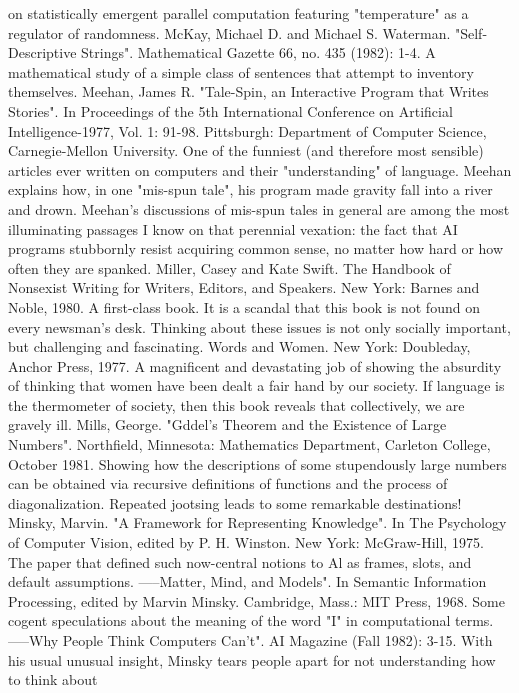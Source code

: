   on statistically emergent parallel computation featuring "temperature" as a regulator of
  randomness.
McKay, Michael D. and Michael S. Waterman. "Self-Descriptive Strings". Mathematical
  Gazette 66, no. 435 (1982): 1-4. A mathematical study of a simple class of sentences that
  attempt to inventory themselves.
Meehan, James R. "Tale-Spin, an Interactive Program that Writes Stories". In Proceedings of
  the 5th International Conference on Artificial Intelligence-1977, Vol. 1: 91-98. Pittsburgh:
  Department of Computer Science, Carnegie-Mellon University. One of the funniest (and
  therefore most sensible) articles ever written on computers and their "understanding" of
  language. Meehan explains how, in one "mis-spun tale", his program made gravity fall into
  a river and drown. Meehan's discussions of mis-spun tales in general are among the most
  illuminating passages I know on that perennial vexation: the fact that AI programs
  stubbornly resist acquiring common sense, no matter how hard or how often they are
  spanked.
Miller, Casey and Kate Swift. The Handbook of Nonsexist Writing for Writers, Editors, and
  Speakers. New York: Barnes and Noble, 1980. A first-class book. It is a scandal that this
  book is not found on every newsman's desk. Thinking about these issues is not only socially
  important, but challenging and fascinating.
Words and Women. New York: Doubleday, Anchor Press, 1977. A magnificent and
  devastating job of showing the absurdity of thinking that women have been dealt a fair hand
  by our society. If language is the thermometer of society, then this book reveals that
  collectively, we are gravely ill.
Mills, George. "Gddel's Theorem and the Existence of Large Numbers". Northfield,
  Minnesota: Mathematics Department, Carleton College, October 1981. Showing how the
  descriptions of some stupendously large numbers can be obtained via recursive definitions
  of functions and the process of diagonalization. Repeated jootsing leads to some remarkable
  destinations!
Minsky, Marvin. "A Framework for Representing Knowledge". In The Psychology of
  Computer Vision, edited by P. H. Winston. New York: McGraw-Hill, 1975. The paper that
  defined such now-central notions to Al as frames, slots, and default assumptions.
-----Matter, Mind, and Models". In Semantic Information Processing, edited by Marvin
  Minsky. Cambridge, Mass.: MIT Press, 1968. Some cogent speculations about the meaning
  of the word "I" in computational terms.
-----Why People Think Computers Can't". AI Magazine (Fall 1982): 3-15. With his usual
  unusual insight, Minsky tears people apart for not understanding how to think about
